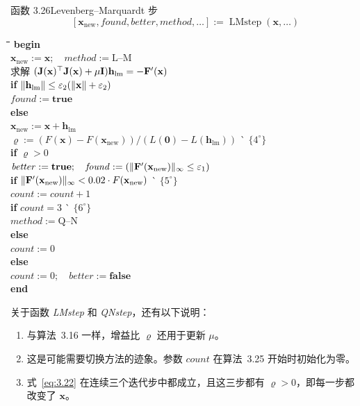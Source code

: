 \begin{statement}{函数 3.26\quad Levenberg--Marquardt 步}
\label{fn:3.26}
\small
\[
  [\mathbf{x}_{\mathrm{new}},\mathit{found},\mathit{better},\mathit{method},\ldots]
       :=\operatorname{LMstep}(\mathbf{x},\ldots)
\]
\begin{tabbing}
\quad\=\quad\=\quad\=\quad\=\quad\=\quad\=\kill
\textbf{begin}\\
\> $\mathbf{x}_{\mathrm{new}}:=\mathbf{x};\quad\mathit{method}:=\text{L--M}$\\
\> 求解 $(\mathbf{J}(\mathbf{x})^{\top}\mathbf{J}(\mathbf{x})+\mu \mathbf{I})\mathbf{h}_{\mathrm{lm}}=-\mathbf{F}'(\mathbf{x})$\\
\> \textbf{if} $\lVert\mathbf{h}_{\mathrm{lm}}\rVert\le\varepsilon_2(\lVert\mathbf{x}\rVert+\varepsilon_2)$\\
\>\> $\mathit{found}:=\textbf{true}$\\
\> \textbf{else}\\
\>\> $\mathbf{x}_{\mathrm{new}}:=\mathbf{x}+\mathbf{h}_{\mathrm{lm}}$\\
\>\> $\varrho:=(F(\mathbf{x})-F(\mathbf{x}_{\mathrm{new}}))/(L(\mathbf{0})-L(\mathbf{h}_{\mathrm{lm}}))$
       \` $\{4^{\circ}\}$\\
\>\> \textbf{if} $\varrho>0$\\
\>\>\> $\mathit{better}:=\textbf{true};\quad
           \mathit{found}:=(\lVert\mathbf{F}'(\mathbf{x}_{\mathrm{new}})\rVert_{\infty}\le\varepsilon_1)$\\
\>\>\> \textbf{if} $\lVert\mathbf{F}'(\mathbf{x}_{\mathrm{new}})\rVert_{\infty}<0.02\cdot F(\mathbf{x}_{\mathrm{new}})$
         \` $\{5^{\circ}\}$\\
\>\>\>\> $\mathit{count}:=\mathit{count}+1$\\
\>\>\>\> \textbf{if} $\mathit{count}=3$ \` $\{6^{\circ}\}$\\
\>\>\>\>\> $\mathit{method}:=\text{Q--N}$\\
\>\>\> \textbf{else}\\
\>\>\>\> $\mathit{count}:=0$\\
\>\> \textbf{else}\\
\>\>\> $\mathit{count}:=0;\quad\mathit{better}:=\textbf{false}$\\
\textbf{end}
\end{tabbing}
\end{statement}

关于函数 \textit{LMstep} 和 \textit{QNstep}，还有以下说明：
\begin{enumerate}[label=\(\arabic*^{\circ}\),start=4,leftmargin=2.8em]
  \item 与算法~3.16 一样，增益比 $\varrho$ 还用于更新 $\mu$。
  \item 这是可能需要切换方法的迹象。参数 $\mathit{count}$ 在算法~3.25 开始时初始化为零。
  \item 式~\eqref{eq:3.22} 在连续三个迭代步中都成立，且这三步都有 $\varrho>0$，即每一步都改变了 $\mathbf{x}$。
\end{enumerate}

